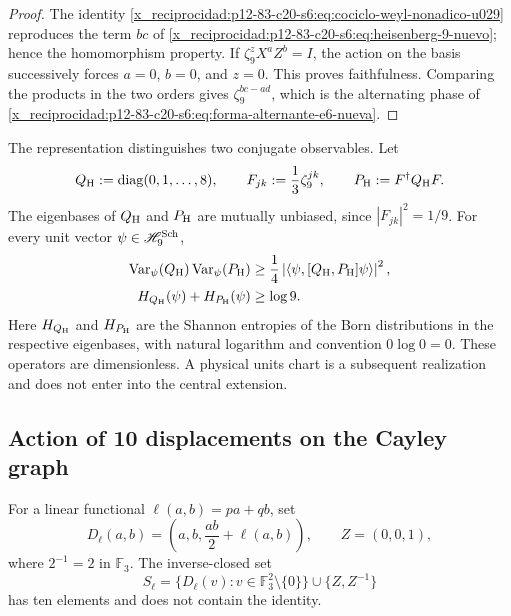 \begin{proof}
The identity \eqref{x_reciprocidad:p12-83-c20-s6:eq:cociclo-weyl-nonadico-u029} reproduces the term
\(bc\) of \eqref{x_reciprocidad:p12-83-c20-s6:eq:heisenberg-9-nuevo}; hence the
homomorphism property. If \(\zeta_9^zX^aZ^b=I\), the action on the basis successively forces
\(a=0\), \(b=0\), and \(z=0\). This proves faithfulness. Comparing
the products in the two orders gives
\(\zeta_9^{bc-ad}\), which is the alternating phase of
\eqref{x_reciprocidad:p12-83-c20-s6:eq:forma-alternante-e6-nueva}.
\end{proof}

The representation distinguishes two conjugate observables. Let
\[
 Q_{\rm H}:=\operatorname{diag}(0,1,\ldots,8),
 \qquad
 F_{jk}:=\frac13\zeta_9^{jk},
 \qquad
 P_{\rm H}:=F^\dagger Q_{\rm H}F.
\]
The eigenbases of \(Q_{\rm H}\) and \(P_{\rm H}\) are mutually
unbiased, since \(|F_{jk}|^2=1/9\). For every unit vector
\(\psi\in\mathscr H_9^{\rm Sch}\),
\begin{align}
 \operatorname{Var}_\psi(Q_{\rm H})
 \operatorname{Var}_\psi(P_{\rm H})
 &\ge
 \frac14\left|
 \langle\psi,[Q_{\rm H},P_{\rm H}]\psi\rangle
 \right|^2,
 \label{x_reciprocidad:p12-83-c20-s6:eq:incertidumbre-weyl-u029}\\
 H_{Q_{\rm H}}(\psi)+H_{P_{\rm H}}(\psi)
 &\ge\log9.
 \label{x_reciprocidad:p12-83-c20-s6:eq:incertidumbre-entropica-weyl-u029}
\end{align}
Here \(H_{Q_{\rm H}}\) and \(H_{P_{\rm H}}\) are the Shannon entropies
of the Born distributions in the respective eigenbases,
with natural logarithm and convention \(0\log0=0\).
These operators are dimensionless. A physical units chart is a
subsequent realization and does not enter into the central extension.

\subsection{Action of 10 displacements on the Cayley graph}

For a linear functional
\(\ell(a,b)=pa+qb\), set
\[
 D_\ell(a,b)=\left(a,b,\frac{ab}{2}+\ell(a,b)\right),
 \qquad Z=(0,0,1),
\]
where \(2^{-1}=2\) in \(\mathbb F_3\). The inverse-closed set
\begin{equation}
 S_\ell=
 \{D_\ell(v):v\in\mathbb F_3^2\setminus\{0\}\}
 \cup\{Z,Z^{-1}\}
 \label{x_reciprocidad:p12-83-c20-s6:eq:conjunto-conexion-e6}
\end{equation}
has ten elements and does not contain the identity.

